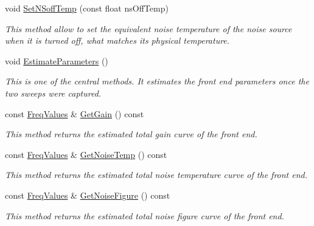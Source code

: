 \begin{DoxyCompactItemize}
\mbox{\label{classFrontEndCalibrator_ae054d1423b8d2cdba2bd223ab8488e2d}} 
void \hyperlink{classFrontEndCalibrator_ae054d1423b8d2cdba2bd223ab8488e2d}{Set\+N\+Soff\+Temp} (const float ns\+Off\+Temp)
\begin{DoxyCompactList}\small\item\em This method allow to set the equivalent noise temperature of the noise source when it is turned off, what matches its physical temperature. \end{DoxyCompactList}\item 
void \hyperlink{classFrontEndCalibrator_a2d643afa2c6bcf15b0f051cdc34855c2}{Estimate\+Parameters} ()
\begin{DoxyCompactList}\small\item\em This is one of the central methods. It estimates the front end parameters once the two sweeps were captured. \end{DoxyCompactList}\item 
\mbox{\label{classFrontEndCalibrator_a9c50d372271fd12e10c295c2b6c98300}} 
const \hyperlink{structFreqValues}{Freq\+Values} \& \hyperlink{classFrontEndCalibrator_a9c50d372271fd12e10c295c2b6c98300}{Get\+Gain} () const
\begin{DoxyCompactList}\small\item\em This method returns the estimated total gain curve of the front end. \end{DoxyCompactList}\item 
\mbox{\label{classFrontEndCalibrator_a62bd5a5fdd4a62e70bf5048d75566df9}} 
const \hyperlink{structFreqValues}{Freq\+Values} \& \hyperlink{classFrontEndCalibrator_a62bd5a5fdd4a62e70bf5048d75566df9}{Get\+Noise\+Temp} () const
\begin{DoxyCompactList}\small\item\em This method returns the estimated total noise temperature curve of the front end. \end{DoxyCompactList}\item 
\mbox{\label{classFrontEndCalibrator_aef62a6573191332e82430093d809ecb3}} 
const \hyperlink{structFreqValues}{Freq\+Values} \& \hyperlink{classFrontEndCalibrator_aef62a6573191332e82430093d809ecb3}{Get\+Noise\+Figure} () const
\begin{DoxyCompactList}\small\item\em This method returns the estimated total noise figure curve of the front end. \end{DoxyCompactList}\item 

\end{DoxyCompactItemize}

